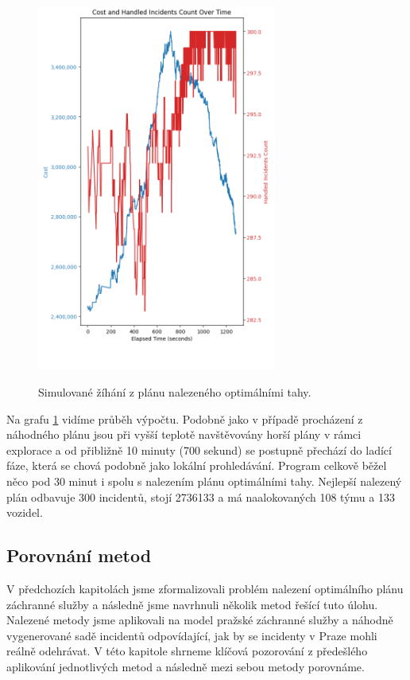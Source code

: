 \begin{figure}[H]
  \caption{Simulované žíhání z plánu nalezeného optimálními tahy.}
  \includegraphics[width=0.7\textwidth,height=0.9\textwidth]{img/plots/sa_optimal.png}
  \centering
  \label{img:sa_optimal}
\end{figure}

Na grafu \ref{img:sa_optimal} vidíme průběh výpočtu.
Podobně jako v případě procházení z náhodného plánu jsou při vyšší teplotě navštěvovány horší plány v rámci explorace a od přibližně 
10 minuty (700 sekund) se postupně přechází do ladící fáze, která se chová podobně jako lokální prohledávání.
Program celkově běžel něco pod 30 minut i spolu s nalezením plánu optimálními tahy.
Nejlepší nalezený plán odbavuje 300 incidentů, stojí 2736133 a má naalokovaných 108 týmu a 133 vozidel.

\subsection{Porovnání metod}

V předchozích kapitolách jsme zformalizovali problém nalezení optimálního plánu záchranné služby a následně jsme navrhnuli několik metod řešící tuto úlohu.
Nalezené metody jsme aplikovali na model pražské záchranné služby a náhodně vygenerované sadě incidentů odpovídající, jak by se incidenty v Praze mohli reálně odehrávat.
V této kapitole shrneme klíčová pozorování z předešlého aplikování jednotlivých metod a následně mezi sebou metody porovnáme. 


